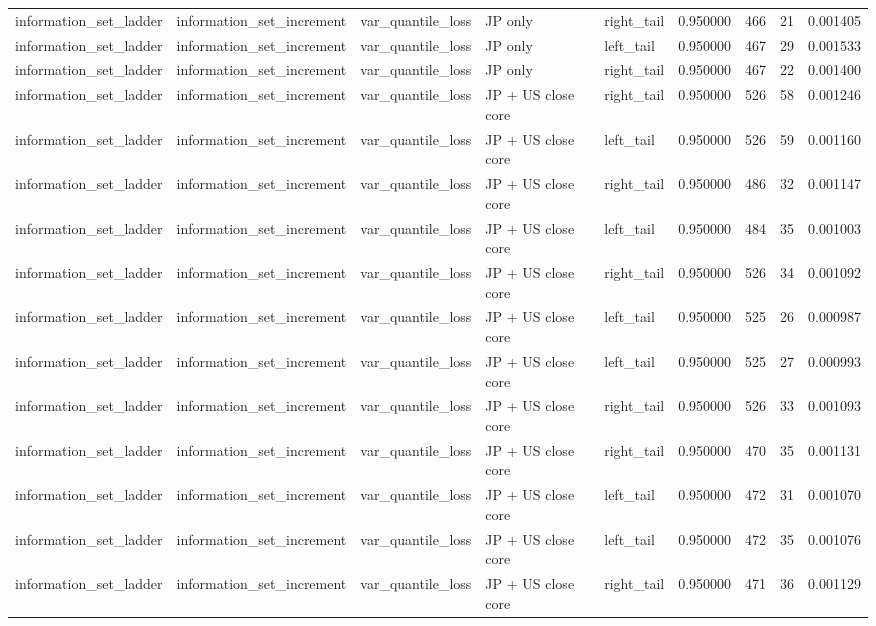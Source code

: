 \begin{tabular}{lllllrrrr}
information\_set\_ladder & information\_set\_increment & var\_quantile\_loss & JP only & right\_tail & 0.950000 & 466 & 21 & 0.001405 \\
information\_set\_ladder & information\_set\_increment & var\_quantile\_loss & JP only & left\_tail & 0.950000 & 467 & 29 & 0.001533 \\
information\_set\_ladder & information\_set\_increment & var\_quantile\_loss & JP only & right\_tail & 0.950000 & 467 & 22 & 0.001400 \\
information\_set\_ladder & information\_set\_increment & var\_quantile\_loss & JP + US close core & right\_tail & 0.950000 & 526 & 58 & 0.001246 \\
information\_set\_ladder & information\_set\_increment & var\_quantile\_loss & JP + US close core & left\_tail & 0.950000 & 526 & 59 & 0.001160 \\
information\_set\_ladder & information\_set\_increment & var\_quantile\_loss & JP + US close core & right\_tail & 0.950000 & 486 & 32 & 0.001147 \\
information\_set\_ladder & information\_set\_increment & var\_quantile\_loss & JP + US close core & left\_tail & 0.950000 & 484 & 35 & 0.001003 \\
information\_set\_ladder & information\_set\_increment & var\_quantile\_loss & JP + US close core & right\_tail & 0.950000 & 526 & 34 & 0.001092 \\
information\_set\_ladder & information\_set\_increment & var\_quantile\_loss & JP + US close core & left\_tail & 0.950000 & 525 & 26 & 0.000987 \\
information\_set\_ladder & information\_set\_increment & var\_quantile\_loss & JP + US close core & left\_tail & 0.950000 & 525 & 27 & 0.000993 \\
information\_set\_ladder & information\_set\_increment & var\_quantile\_loss & JP + US close core & right\_tail & 0.950000 & 526 & 33 & 0.001093 \\
information\_set\_ladder & information\_set\_increment & var\_quantile\_loss & JP + US close core & right\_tail & 0.950000 & 470 & 35 & 0.001131 \\
information\_set\_ladder & information\_set\_increment & var\_quantile\_loss & JP + US close core & left\_tail & 0.950000 & 472 & 31 & 0.001070 \\
information\_set\_ladder & information\_set\_increment & var\_quantile\_loss & JP + US close core & left\_tail & 0.950000 & 472 & 35 & 0.001076 \\
information\_set\_ladder & information\_set\_increment & var\_quantile\_loss & JP + US close core & right\_tail & 0.950000 & 471 & 36 & 0.001129 \\

\end{tabular}
